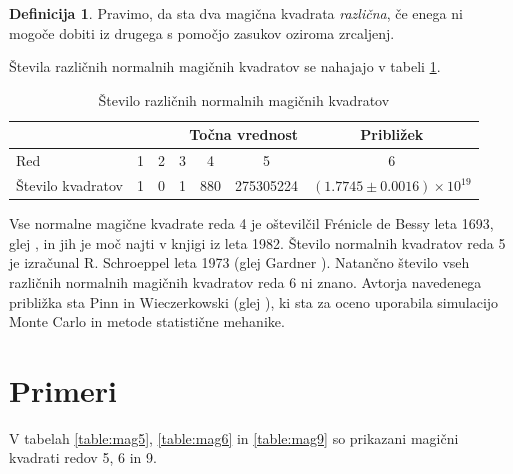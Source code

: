 \documentclass[a4paper,12pt]{article}
\theoremstyle{plain}
\theoremstyle{definition}
\newtheorem{definition}{Definicija}
\begin{document}
\begin{definition}
      Pravimo, da sta dva magična kvadrata \textcolor{Mahogany}{\emph{različna}}, če enega ni mogoče dobiti
      iz drugega s pomočjo zasukov oziroma zrcaljenj.
\end{definition}

Števila različnih normalnih magičnih kvadratov se nahajajo v tabeli \ref{stevila}.

\begin{table}[h!]
    \centering
    \caption{Število različnih normalnih magičnih kvadratov}
    \label{stevila}
    \begin{tabular}{lcccccc}
        \hline
        \multicolumn{6}{r}{Točna vrednost} & Približek \\ \hline
        Red & 1 & 2 & 3 & 4 & 5 & 6 \\ 
        Število kvadratov & 1 & 0 & 1 & 880 & 275305224 & $(1.7745 \pm 0.0016) \times 10^{19}$ \\ \hline
    \end{tabular}
\end{table}

Vse normalne magične kvadrate reda 4 je oštevilčil Frénicle de Bessy
leta 1693, glej \cite{bessy}, in jih je moč najti v knjigi \cite{berlekamp}
iz leta 1982. Število normalnih kvadratov reda 5 je izračunal
R. Schroeppel leta 1973 (glej Gardner \cite{gardner}).
Natančno število vseh različnih normalnih magičnih kvadratov reda 6 ni znano.
Avtorja navedenega približka sta Pinn in Wieczerkowski (glej \cite{pinn}), ki
sta za oceno uporabila simulacijo Monte Carlo in metode statistične mehanike.


\section{Primeri}

V tabelah \ref{table:mag5}, \ref{table:mag6} in \ref{table:mag9} so prikazani
magični kvadrati redov 5, 6 in 9.
\end{document}
